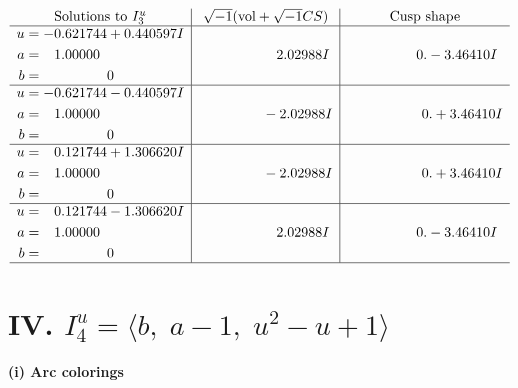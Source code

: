 \documentclass[1p]{elsarticle_modified}
\theoremstyle{definition}
\newcommand{\I}{\sqrt{-1}}
\begin{document}
$$\begin{array}{c|c|c}  
\text{Solutions to }I^u_{3}& \I (\text{vol} + \sqrt{-1}CS) & \text{Cusp shape}\\
 \hline 
\begin{aligned}
u &= -0.621744 + 0.440597 I \\
a &= \phantom{-}1.00000\phantom{ +0.000000I} \\
b &= \phantom{-0.000000 } 0\end{aligned}
 & \phantom{-0.000000 -}2.02988 I & \phantom{-0.000000 } 0. - 3.46410 I \\ \hline\begin{aligned}
u &= -0.621744 - 0.440597 I \\
a &= \phantom{-}1.00000\phantom{ +0.000000I} \\
b &= \phantom{-0.000000 } 0\end{aligned}
 & \phantom{-0.000000 } -2.02988 I & \phantom{-0.000000 -}0. + 3.46410 I \\ \hline\begin{aligned}
u &= \phantom{-}0.121744 + 1.306620 I \\
a &= \phantom{-}1.00000\phantom{ +0.000000I} \\
b &= \phantom{-0.000000 } 0\end{aligned}
 & \phantom{-0.000000 } -2.02988 I & \phantom{-0.000000 -}0. + 3.46410 I \\ \hline\begin{aligned}
u &= \phantom{-}0.121744 - 1.306620 I \\
a &= \phantom{-}1.00000\phantom{ +0.000000I} \\
b &= \phantom{-0.000000 } 0\end{aligned}
 & \phantom{-0.000000 -}2.02988 I & \phantom{-0.000000 } 0. - 3.46410 I\\
 \hline 
 \end{array}$$\newpage\newpage\renewcommand{\arraystretch}{1}
\centering \section*{IV. $I^u_{4}= \langle b,\;a-1,\;u^2- u+1 \rangle$}
\flushleft \textbf{(i) Arc colorings}\\
\end{document}

